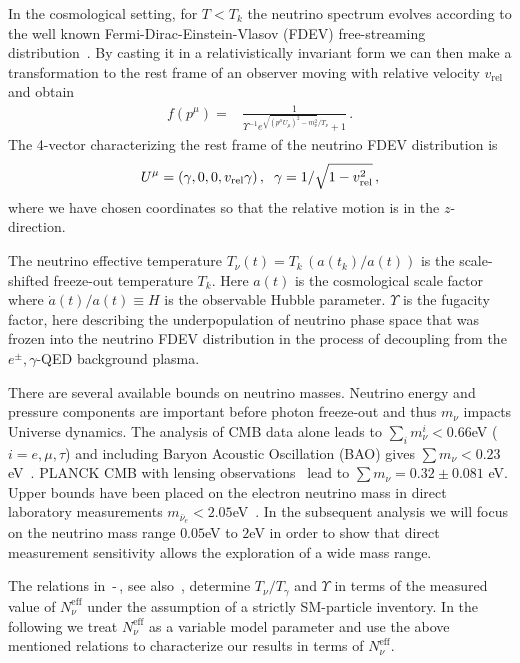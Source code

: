 In the cosmological setting, for $T<T_k$ the neutrino spectrum evolves according to the well known Fermi-Dirac-Einstein-Vlasov (FDEV) free-streaming  distribution~\cite{Langacker:1982ih,Choquet-Bruhat:2009xil,Wong:2011ip,Birrell:2012gg}.  By casting it in a relativistically invariant form we can then make a transformation to the rest frame of an observer moving with relative velocity $v_{\text{rel}}$ and obtain
\begin{align}\label{neutrino_dist_B}
f(p^\mu)=&\frac{1}{\Upsilon^{-1} e^{\sqrt{(p^\mu U_\mu)^2-m_\nu^2}/T_\nu}+1}\,.
\end{align}
The 4-vector characterizing the rest frame of the neutrino FDEV distribution is
\begin{equation}\label{4_vel}
U^\mu=(\gamma,0,0,v_{\text{rel}}\gamma)\,,\hspace{2mm} \gamma={1}/{\sqrt{1-v_{\text{rel}}^2}}\,,
\end{equation} 
where we have chosen coordinates so that the relative motion is in the $z$-direction. 

The neutrino effective temperature $T_\nu(t)= T_k\,(a(t_k)/a(t))$ is the scale-shifted freeze-out temperature $T_k$. Here $a(t)$ is the cosmological scale factor where $\dot a(t)/a(t)\equiv H$ is the observable Hubble parameter. $\Upsilon$ is the  fugacity factor, here describing the underpopulation of neutrino phase space that was frozen into the neutrino FDEV distribution in the process of decoupling from the $e^\pm,\gamma$-QED background  plasma.

There are several available bounds on neutrino masses. Neutrino energy and pressure components are important before photon freeze-out and thus $m_\nu$ impacts Universe dynamics. The analysis of CMB data alone leads to $\sum_i m_\nu^i<0.66$eV ($i=e,\mu,\tau$) and including Baryon Acoustic Oscillation (BAO) gives $\sum m_\nu<0.23$eV~\cite{Planck:2013pxb}.  {\small PLANCK CMB} with lensing observations~\cite{Battye:2013xqa} lead to  $\sum m_{\nu}=0.32\pm0.081$ eV. Upper bounds have been placed on the electron neutrino mass in direct laboratory measurements  $m_{\bar\nu_e}<2.05$eV~\cite{Troitsk:2011cvm}.   In the subsequent analysis we will focus on the neutrino mass range $0.05$eV to $2$eV in order to show that direct measurement sensitivity allows the exploration of a wide mass range. 

 The relations in \,-\,, see also~\cite{Birrell:2012gg}, determine $T_\nu/T_\gamma$ and  $\Upsilon$ in terms of the measured  value of  $N_\nu^{\mathrm{eff}}$ under the assumption of a strictly SM-particle inventory.  In the following we treat $N_\nu^{\mathrm{eff}}$  as a variable model parameter and use the above mentioned relations to characterize our results in terms of $N_\nu^{\mathrm{eff}}$.

